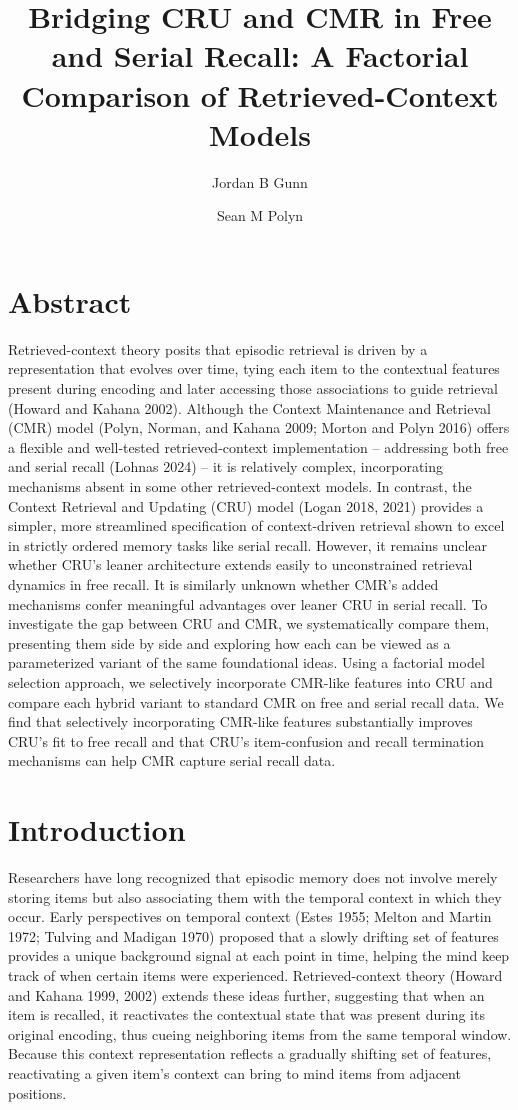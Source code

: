 \documentclass[
  letterpaper,
  DIV=11,
  numbers=noendperiod]{scrartcl}
\title{Bridging CRU and CMR in Free and Serial Recall: A Factorial
Comparison of Retrieved-Context Models}
\author{Jordan B Gunn \and Sean M Polyn}
\date{}
\begin{document}
\maketitle


\section{Abstract}\label{abstract}

Retrieved-context theory posits that episodic retrieval is driven by a
representation that evolves over time, tying each item to the contextual
features present during encoding and later accessing those associations
to guide retrieval (Howard and Kahana 2002). Although the Context
Maintenance and Retrieval (CMR) model (Polyn, Norman, and Kahana 2009;
Morton and Polyn 2016) offers a flexible and well-tested
retrieved-context implementation -- addressing both free and serial
recall (Lohnas 2024) -- it is relatively complex, incorporating
mechanisms absent in some other retrieved-context models. In contrast,
the Context Retrieval and Updating (CRU) model (Logan 2018, 2021)
provides a simpler, more streamlined specification of context-driven
retrieval shown to excel in strictly ordered memory tasks like serial
recall. However, it remains unclear whether CRU's leaner architecture
extends easily to unconstrained retrieval dynamics in free recall. It is
similarly unknown whether CMR's added mechanisms confer meaningful
advantages over leaner CRU in serial recall. To investigate the gap
between CRU and CMR, we systematically compare them, presenting them
side by side and exploring how each can be viewed as a parameterized
variant of the same foundational ideas. Using a factorial model
selection approach, we selectively incorporate CMR-like features into
CRU and compare each hybrid variant to standard CMR on free and serial
recall data. We find that selectively incorporating CMR-like features
substantially improves CRU's fit to free recall and that CRU's
item-confusion and recall termination mechanisms can help CMR capture
serial recall data.

\section{Introduction}\label{introduction}

Researchers have long recognized that episodic memory does not involve
merely storing items but also associating them with the temporal context
in which they occur. Early perspectives on temporal context (Estes 1955;
Melton and Martin 1972; Tulving and Madigan 1970) proposed that a slowly
drifting set of features provides a unique background signal at each
point in time, helping the mind keep track of when certain items were
experienced. Retrieved-context theory (Howard and Kahana 1999, 2002)
extends these ideas further, suggesting that when an item is recalled,
it reactivates the contextual state that was present during its original
encoding, thus cueing neighboring items from the same temporal window.
Because this context representation reflects a gradually shifting set of
features, reactivating a given item's context can bring to mind items
from adjacent positions.
\end{document}
